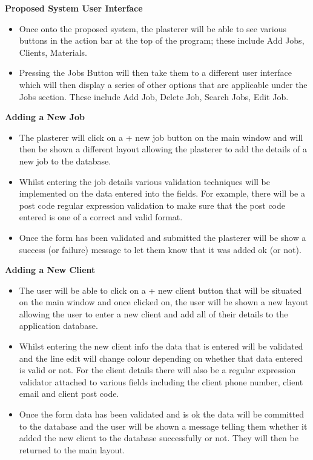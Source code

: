 \textbf{Proposed System User Interface}
	\begin{itemize}
		\item Once onto the proposed system, the plasterer will be able to see various buttons in the action bar at the top of the program; these include Add
Jobs, Clients, Materials.
		\item Pressing the Jobs Button will then take them to a different user interface which will then display a series of other options that are applicable under the Jobs section. These include Add Job, Delete Job, Search Jobs, Edit Job. 

	\end{itemize}
\textbf{Adding a New Job}
	\begin{itemize}
		\item The plasterer will click on a + new job button on the main window and will then be shown a different layout allowing the plasterer to add the details of a new job to the database.
		\item Whilst entering the job details various validation techniques will be implemented on the data entered into the fields. For example, there will be a post code regular expression validation to make sure that the post code entered is one of a correct and valid format.
		\item Once the form has been validated and submitted the plasterer will be show a success (or failure) message to let them know that it was added ok (or not).
	\end{itemize}

\textbf{Adding a New Client}

	\begin{itemize}
		\item The user will be able to click on a + new client button that will be situated on the main window and once clicked on, the user will be shown a new layout allowing the user to enter a new client and add all of their details to the application database.
		\item Whilst entering the new client info the data that is entered will be validated and the line edit will change colour depending on whether that data entered is valid or not. For the client details there will also be a regular expression validator attached to various fields including the client phone number, client email and client post code.
		\item Once the form data has been validated and is ok the data will be committed to the database and the user will be shown a message telling them whether it added the new client to the database successfully or not. They will then be returned to the main layout.
	\end{itemize}

